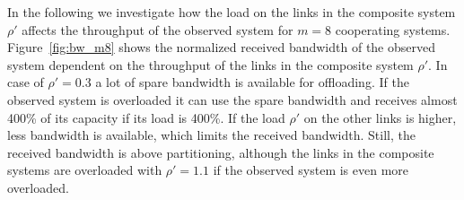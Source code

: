 In the following we investigate how the load on the links in the composite system $\rho'$ affects the throughput of the observed system for $m=8$ cooperating systems.
Figure~\ref{fig:bw_m8} shows the normalized received bandwidth of the observed system dependent on the throughput of the links in the composite system $\rho'$.
In case of $\rho'=0.3$ a lot of spare bandwidth is available for offloading. If the observed system is overloaded it can use the spare bandwidth and receives almost 400\% of its capacity if its load is 400\%. If the load $\rho'$ on the other links is higher, less bandwidth is available, which limits the received bandwidth. Still, the received bandwidth is above partitioning, although the links in the composite systems are overloaded with $\rho'=1.1$ if the observed system is even more overloaded.


